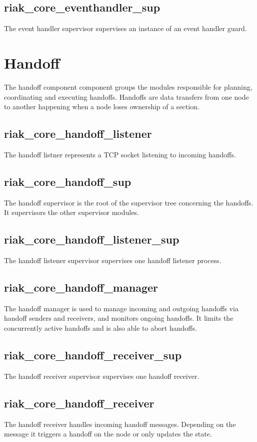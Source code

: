 	\subsection{riak\_core\_eventhandler\_sup}
		The event handler supervisor supervises an instance of an event handler guard.
	

\section{Handoff}
	The handoff component component groups the modules responsible for planning, coordinating and executing handoffs.
	Handoffs are data transfers from one node to another happening when a node loses ownership of a section.
	\subsection{riak\_core\_handoff\_listener}
		The handoff listner represents a TCP socket listening to incoming handoffs.
	
	\subsection{riak\_core\_handoff\_sup}
		The handoff supervisor is the root of the supervisor tree concerning the handoffs.
		It supervisors the other supervisor modules.
	
	\subsection{riak\_core\_handoff\_listener\_sup}
		The handoff listener supervisor supervises one handoff listener process.
	
	\subsection{riak\_core\_handoff\_manager}
		The handoff manager is used to manage incoming and outgoing handoffs via handoff senders and receivers, and monitors ongoing handoffs.
		It limits the concurrently active handoffs and is also able to abort  handoffs.
	
	\subsection{riak\_core\_handoff\_receiver\_sup}
		The handoff receiver supervisor supervises one handoff receiver.
	
	\subsection{riak\_core\_handoff\_receiver}
		The handoff receiver handles incoming handoff messages.
		Depending on the message it triggers a handoff on the node or only updates the state.
	
